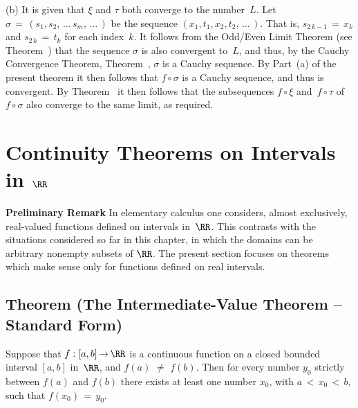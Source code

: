 \V

        (b) It is given that ${\xi}$ and ${\tau}$ both converge to the number~$L$.
    Let ${\sigma} \,=\, (s_{1}, s_{2},\,{\ldots}\,s_{m}, \,{\ldots}\,)$ be the sequence $(x_{1}, t_{1}, x_{2},t_{2},\,{\ldots}\,)$.
    That is, $s_{2\,k-1} \,=\, x_{k}$ and $s_{2\,k} \,=\, t_{k}$ for each index~$k$.
    It follows from the Odd/Even Limit Theorem (see Theorem~) that the sequence ${\sigma}$ is also convergent to~$L$,
    and thus, by the Cauchy Convergence Theorem, Theorem~, ${\sigma}$ is a Cauchy sequence.
    By Part~(a) of the present theorem it then follows that $f{\circ}{\sigma}$ is a Cauchy sequence, and thus is convergent.
    By Theorem~ it then follows that the subsequences $f{\circ}{\xi}$
    and~$f{\circ}{\tau}$ of $f{\circ}{\sigma}$ also converge to the same limit, as required.

\VV

                \section{{\bf Continuity Theorems on Intervals in ${\RR}$}}
                \label{SectD40}

\V

        {\bf Preliminary Remark} In elementary calculus one considers, almost exclusively, real-valued functions defined on intervals in~${\RR}$.
    This contrasts with the situations considered so far in this chapter, in which the domains can be arbitrary nonempty subsets of ${\RR}$.
    The present section focuses on theorems which make sense only for functions defined on real intervals.

\VV


            \subsection{\small{\bf Theorem} (The Intermediate-Value Theorem -- Standard Form)}
            \label{ThmD25.30}

\V

        Suppose that $f:[a,b] \,{\rightarrow}\, {\RR}$ is a continuous function on a closed bounded interval $[a,b]$ in~${\RR}$, and $f(a) \,\,{\neq}\,\, f(b)$.
    Then for every number $y_{0}$ strictly between $f(a)$ and $f(b)$ there exists at least one number $x_{0}$, with $a\,<\,x_{0}\,<\,b$,
    such that $f(x_{0}) \,=\, y_{0}$.

